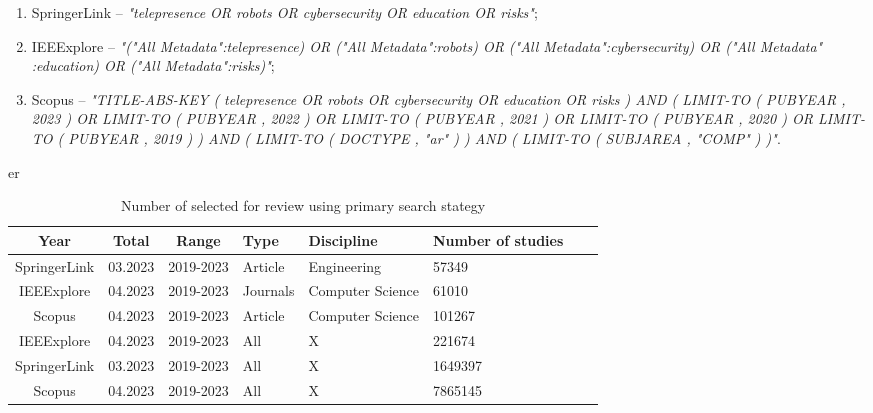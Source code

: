 \begin{enumerate}
\item SpringerLink -- \textit{"telepresence OR robots OR cybersecurity OR education OR risks"};
\item IEEExplore -- \textit{"("All Metadata":telepresence) OR ("All Metadata":robots) OR ("All Metadata":cybersecurity) OR ("All Metadata"
:education) OR ("All Metadata":risks)"};
\item Scopus -- \textit{"TITLE-ABS-KEY ( telepresence OR robots OR cybersecurity OR education OR risks )  AND  ( LIMIT-TO ( PUBYEAR ,
2023 )  OR LIMIT-TO ( PUBYEAR ,  2022 )  OR LIMIT-TO ( PUBYEAR ,  2021 )  OR LIMIT-TO ( PUBYEAR ,  2020 )  OR LIMIT-TO ( PUBYEAR
,  2019 ) )  AND  ( LIMIT-TO ( DOCTYPE ,  "ar" ) )  AND  ( LIMIT-TO ( SUBJAREA ,  "COMP" ) )"}.
\end{enumerate}


\begin{table}[htb]
\centering
er
\caption{Number of selected for review using primary search stategy}
\label{tab:query-results}
\begin{tabularx}{\textwidth}{|c|c|c|Y|Y|Y|Y|Y|}
\hline
\textbf{Year} & \textbf{Total} & \textbf{Range} & \textbf{Type} & \textbf{Discipline} & \textbf{Number of studies} \\\hline
SpringerLink  & 03.2023        & 2019-2023      & Article       & Engineering         & 57349                      \\\hline
IEEExplore    & 04.2023        & 2019-2023      & Journals      & Computer Science    & 61010                      \\\hline
Scopus        & 04.2023        & 2019-2023      & Article       & Computer Science    & 101267                     \\\hline
IEEExplore    & 04.2023        & 2019-2023      & All           & X                   & 221674                     \\\hline
SpringerLink  & 03.2023        & 2019-2023      & All           & X                   & 1649397                    \\\hline
Scopus        & 04.2023        & 2019-2023      & All           & X                   & 7865145                    \\\hline
\end{tabularx}
\end{table}


